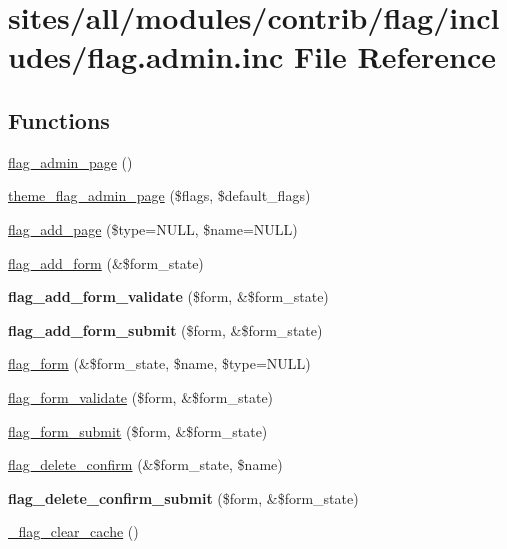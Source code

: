 \hypertarget{flag_8admin_8inc}{
\section{sites/all/modules/contrib/flag/includes/flag.admin.inc File Reference}
\label{flag_8admin_8inc}
}
\subsection*{Functions}
\begin{CompactItemize}
\item 
\hyperlink{flag_8admin_8inc_4836a38f1988d95bbbe667f4696d9d33}{flag\_\-admin\_\-page} ()
\item 
\hyperlink{flag_8admin_8inc_f8043046f8852d720d2aa84b1ac3c607}{theme\_\-flag\_\-admin\_\-page} (\$flags, \$default\_\-flags)
\item 
\hyperlink{flag_8admin_8inc_8af993acc60c3b818942d8177d1525aa}{flag\_\-add\_\-page} (\$type=NULL, \$name=NULL)
\item 
\hyperlink{flag_8admin_8inc_8ad4dca3c0dbf588e00bbb28e7ceb53f}{flag\_\-add\_\-form} (\&\$form\_\-state)
\item 
\hypertarget{flag_8admin_8inc_ff940b79db78cadf27f522ffa3052a33}{
\textbf{flag\_\-add\_\-form\_\-validate} (\$form, \&\$form\_\-state)}
\label{flag_8admin_8inc_ff940b79db78cadf27f522ffa3052a33}

\item 
\hypertarget{flag_8admin_8inc_eff33be0149cb49069f78181b5328a6f}{
\textbf{flag\_\-add\_\-form\_\-submit} (\$form, \&\$form\_\-state)}
\label{flag_8admin_8inc_eff33be0149cb49069f78181b5328a6f}

\item 
\hyperlink{flag_8admin_8inc_924a401068a0ae9c660ff187e1c84e51}{flag\_\-form} (\&\$form\_\-state, \$name, \$type=NULL)
\item 
\hyperlink{flag_8admin_8inc_4fb77a5a0f2ab53f8823b3a0d79dc4bd}{flag\_\-form\_\-validate} (\$form, \&\$form\_\-state)
\item 
\hyperlink{flag_8admin_8inc_9f457d3b15f5bc2948a11dafe129efcb}{flag\_\-form\_\-submit} (\$form, \&\$form\_\-state)
\item 
\hyperlink{flag_8admin_8inc_d8dc93ec56970ea7459c83e2462eb264}{flag\_\-delete\_\-confirm} (\&\$form\_\-state, \$name)
\item 
\hypertarget{flag_8admin_8inc_48e46fbbdf50c0c403efc6ae4c9598dd}{
\textbf{flag\_\-delete\_\-confirm\_\-submit} (\$form, \&\$form\_\-state)}
\label{flag_8admin_8inc_48e46fbbdf50c0c403efc6ae4c9598dd}

\item 
\hyperlink{flag_8admin_8inc_536576b3f0495a064f0941d1e070964f}{\_\-flag\_\-clear\_\-cache} ()
\end{CompactItemize}


